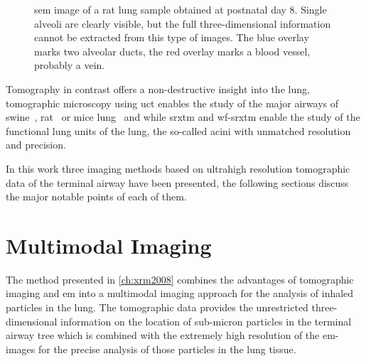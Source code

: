 \begin{figure}
	\noindent{}%
	\caption[\acs{sem} image of a rat lung sample]{\ac{sem} image of a rat lung sample obtained at postnatal day 8. Single alveoli are clearly visible, but the full three-dimensional information cannot be extracted from this type of images. The blue overlay marks two alveolar ducts, the red overlay marks a blood vessel, probably a vein.}%
	\label{fig:sem}%
\end{figure}

Tomography in contrast offers a non-destructive insight into the lung, tomographic microscopy using \ac{uct} enables the study of the major airways of swine~\cite{Litzlbauer2006}, rat~\cite{Langheinrich2004a,Sharif2010} or mice lung~\cite{Langheinrich2004,Ritman2005} and while \ac{srxtm} and \ac{wf-srxtm} enable the study of the functional lung units of the lung, the so-called acini with unmatched resolution and precision.

In this work three imaging methods based on ultrahigh resolution tomographic data of the terminal airway have been presented, the following sections discuss the major notable points of each of them.

\section{Multimodal Imaging}
The method presented in \autoref{ch:xrm2008} combines the advantages of tomographic imaging and \ac{em} into a multimodal imaging approach for the analysis of inhaled particles in the lung. The tomographic data provides the unrestricted three-dimensional information on the location of sub-micron particles in the terminal airway tree which is combined with the extremely high resolution of the \ac{em}-images for the precise analysis of those particles in the lung tissue.

